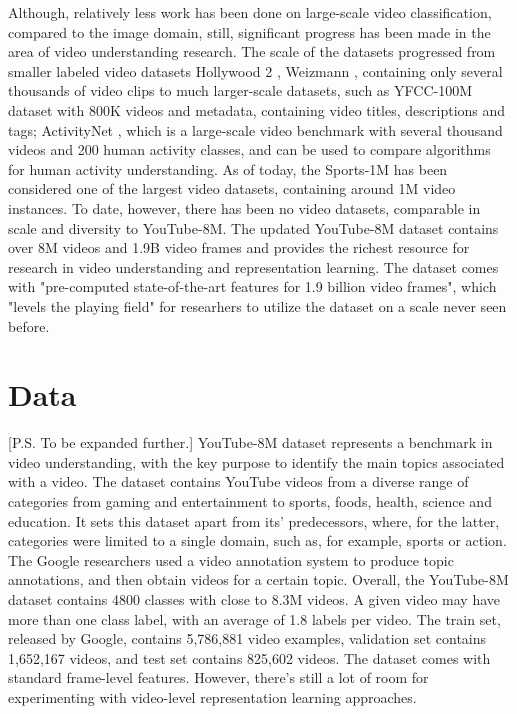 \documentclass{sig-alternate-05-2015}
\begin{document}
Although, relatively less work has been done on large-scale video classification, compared to the image domain, still, significant progress has been made in the area of video understanding research. The scale of the datasets progressed from smaller labeled video datasets Hollywood 2 \cite{7}, Weizmann \cite{8}, containing only several thousands of video clips to much larger-scale datasets, such as YFCC-100M dataset \cite{9} with 800K videos and metadata, containing video titles, descriptions and tags; ActivityNet \cite{10}, which is a large-scale video benchmark with several thousand videos and 200 human activity classes, and can be used to compare algorithms for human activity understanding. As of today, the Sports-1M \cite{11} has been considered one of the largest video datasets, containing around 1M video instances. To date, however, there has been no video datasets, comparable in scale and diversity to YouTube-8M. The updated YouTube-8M dataset contains over 8M videos and 1.9B video frames and provides the richest resource for research in video understanding and representation learning. The dataset comes with "pre-computed state-of-the-art features for 1.9 billion video frames", which "levels the playing field" for researhers to utilize the dataset on a scale never seen before. 

\section{Data}
[P.S. To be expanded further.] YouTube-8M dataset represents a benchmark in video understanding, with the key purpose to identify the main topics associated with a video. The dataset contains YouTube videos from a diverse range of categories from gaming and entertainment  to sports, foods, health, science and education. It sets this dataset apart from its' predecessors, where, for the latter, categories were limited to a single domain, such as, for example, sports or action. The Google researchers used a video annotation system \cite{12} to produce topic annotations, and then obtain videos for a certain topic. Overall, the YouTube-8M dataset contains 4800 classes with close to 8.3M videos. A given video may have more than one class label, with an average of 1.8 labels per video. The train set, released by Google, contains 5,786,881 video examples, validation set contains 1,652,167 videos, and test set contains 825,602 videos. The dataset comes with standard frame-level features. However, there's still a lot of room for experimenting with video-level representation learning approaches. 
\end{document}
